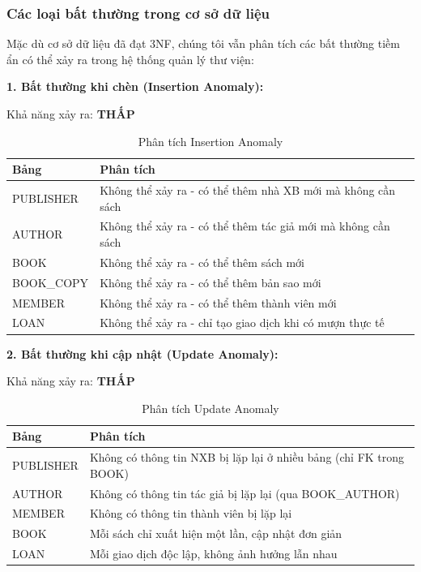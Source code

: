 \documentclass[12pt,a4paper]{article}
\begin{document}
\subsubsection{Các loại bất thường trong cơ sở dữ liệu}

Mặc dù cơ sở dữ liệu đã đạt 3NF, chúng tôi vẫn phân tích các bất thường tiềm ẩn có thể xảy ra trong hệ thống quản lý thư viện:

\textbf{1. Bất thường khi chèn (Insertion Anomaly):}

Khả năng xảy ra: \textbf{THẤP}

\begin{table}[H]
\centering
\caption{Phân tích Insertion Anomaly}
\begin{tabular}{@{}|l|p{10cm}|@{}}
\hline
\textbf{Bảng} & \textbf{Phân tích} \\ \hline
PUBLISHER & Không thể xảy ra - có thể thêm nhà XB mới mà không cần sách \\ \hline
AUTHOR & Không thể xảy ra - có thể thêm tác giả mới mà không cần sách \\ \hline
BOOK & Không thể xảy ra - có thể thêm sách mới \\ \hline
BOOK\_COPY & Không thể xảy ra - có thể thêm bản sao mới \\ \hline
MEMBER & Không thể xảy ra - có thể thêm thành viên mới \\ \hline
LOAN & Không thể xảy ra - chỉ tạo giao dịch khi có mượn thực tế \\ \hline
\end{tabular}
\end{table}

\textbf{2. Bất thường khi cập nhật (Update Anomaly):}

Khả năng xảy ra: \textbf{THẤP}

\begin{table}[H]
\centering
\caption{Phân tích Update Anomaly}
\begin{tabular}{@{}|l|p{10cm}|@{}}
\hline
\textbf{Bảng} & \textbf{Phân tích} \\ \hline
PUBLISHER & Không có thông tin NXB bị lặp lại ở nhiều bảng (chỉ FK trong BOOK) \\ \hline
AUTHOR & Không có thông tin tác giả bị lặp lại (qua BOOK\_AUTHOR) \\ \hline
MEMBER & Không có thông tin thành viên bị lặp lại \\ \hline
BOOK & Mỗi sách chỉ xuất hiện một lần, cập nhật đơn giản \\ \hline
LOAN & Mỗi giao dịch độc lập, không ảnh hưởng lẫn nhau \\ \hline
\end{tabular}
\end{table}
\end{document}
